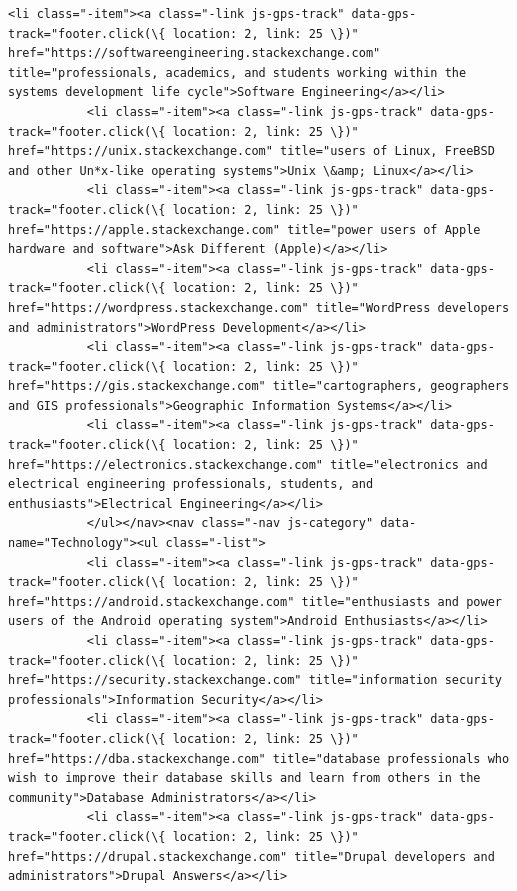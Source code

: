 \documentclass[11pt]{article}
\begin{document}
\begin{Verbatim}[commandchars=\\\{\}]
           <li class="-item"><a class="-link js-gps-track" data-gps-track="footer.click(\{ location: 2, link: 25 \})" href="https://softwareengineering.stackexchange.com" title="professionals, academics, and students working within the systems development life cycle">Software Engineering</a></li>
           <li class="-item"><a class="-link js-gps-track" data-gps-track="footer.click(\{ location: 2, link: 25 \})" href="https://unix.stackexchange.com" title="users of Linux, FreeBSD and other Un*x-like operating systems">Unix \&amp; Linux</a></li>
           <li class="-item"><a class="-link js-gps-track" data-gps-track="footer.click(\{ location: 2, link: 25 \})" href="https://apple.stackexchange.com" title="power users of Apple hardware and software">Ask Different (Apple)</a></li>
           <li class="-item"><a class="-link js-gps-track" data-gps-track="footer.click(\{ location: 2, link: 25 \})" href="https://wordpress.stackexchange.com" title="WordPress developers and administrators">WordPress Development</a></li>
           <li class="-item"><a class="-link js-gps-track" data-gps-track="footer.click(\{ location: 2, link: 25 \})" href="https://gis.stackexchange.com" title="cartographers, geographers and GIS professionals">Geographic Information Systems</a></li>
           <li class="-item"><a class="-link js-gps-track" data-gps-track="footer.click(\{ location: 2, link: 25 \})" href="https://electronics.stackexchange.com" title="electronics and electrical engineering professionals, students, and enthusiasts">Electrical Engineering</a></li>
           </ul></nav><nav class="-nav js-category" data-name="Technology"><ul class="-list">
           <li class="-item"><a class="-link js-gps-track" data-gps-track="footer.click(\{ location: 2, link: 25 \})" href="https://android.stackexchange.com" title="enthusiasts and power users of the Android operating system">Android Enthusiasts</a></li>
           <li class="-item"><a class="-link js-gps-track" data-gps-track="footer.click(\{ location: 2, link: 25 \})" href="https://security.stackexchange.com" title="information security professionals">Information Security</a></li>
           <li class="-item"><a class="-link js-gps-track" data-gps-track="footer.click(\{ location: 2, link: 25 \})" href="https://dba.stackexchange.com" title="database professionals who wish to improve their database skills and learn from others in the community">Database Administrators</a></li>
           <li class="-item"><a class="-link js-gps-track" data-gps-track="footer.click(\{ location: 2, link: 25 \})" href="https://drupal.stackexchange.com" title="Drupal developers and administrators">Drupal Answers</a></li>

\end{Verbatim}
\end{document}
